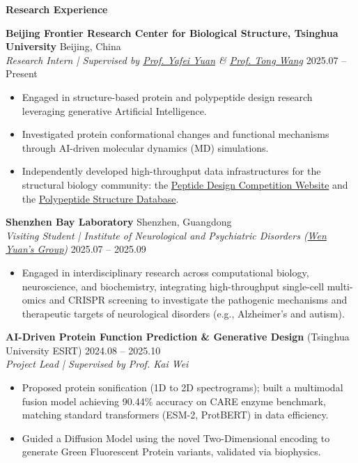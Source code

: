 \documentclass[10pt]{article}
\begin{document}
	\vspace{2pt}
	\begin{center}
		\textbf{\large Research Experience}
	\end{center}
	\vspace{-4pt}
	\textbf{Beijing Frontier Research Center for Biological Structure, Tsinghua University} \hfill Beijing, China \\
	\textit{Research Intern | Supervised by \href{https://scholar.google.com/citations?user=gnJCO14AAAAJ}{Prof. Yafei Yuan} \& \href{https://wanggroup.ai/}{Prof. Tong Wang}} \hfill 2025.07 – Present
	\begin{itemize}[noitemsep, topsep=2pt, partopsep=0pt, parsep=0pt, leftmargin=*]
		\item Engaged in structure-based protein and polypeptide design research leveraging generative Artificial Intelligence.
		\item Investigated protein conformational changes and functional mechanisms through AI-driven molecular dynamics (MD) simulations.
		\item Independently developed high-throughput data infrastructures for the structural biology community: the \href{https://www.fbs.frcbs.tsinghua.edu.cn/competition/2025Peptide/}{Peptide Design Competition Website} and the \href{https://www.frcbs.tsinghua.edu.cn/cpdb/}{Polypeptide Structure Database}.
	\end{itemize}
	
	\vspace{2pt}
	\textbf{Shenzhen Bay Laboratory} \hfill Shenzhen, Guangdong \\
	\textit{Visiting Student | Institute of Neurological and Psychiatric Disorders (\href{https://www.szbl.ac.cn/research/group/Wen-Yuan.htm}{Wen Yuan's Group})} \hfill 2025.07 – 2025.09
	\begin{itemize}[noitemsep, topsep=2pt, partopsep=0pt, parsep=0pt, leftmargin=*]
		\item Engaged in interdisciplinary research across computational biology, neuroscience, and biochemistry, integrating high-throughput single-cell multi-omics and CRISPR screening to investigate the pathogenic mechanisms and therapeutic targets of neurological disorders (e.g., Alzheimer's and autism).
	\end{itemize}
	
	\vspace{2pt}
	\textbf{AI-Driven Protein Function Prediction \& Generative Design} (Tsinghua University ESRT) \hfill 2024.08 – 2025.10 \\
	\textit{Project Lead | Supervised by Prof. Kai Wei}
	\begin{itemize}[noitemsep, topsep=2pt, partopsep=0pt, parsep=0pt, leftmargin=*]
		\item Proposed protein sonification (1D to 2D spectrograms); built a multimodal fusion model achieving 90.44\% accuracy on CARE enzyme benchmark, matching standard transformers (ESM-2, ProtBERT) in data efficiency.
		\item Guided a Diffusion Model using the novel Two-Dimensional encoding to generate Green Fluorescent Protein variants, validated via biophysics.
	\end{itemize}
	
\end{document}
